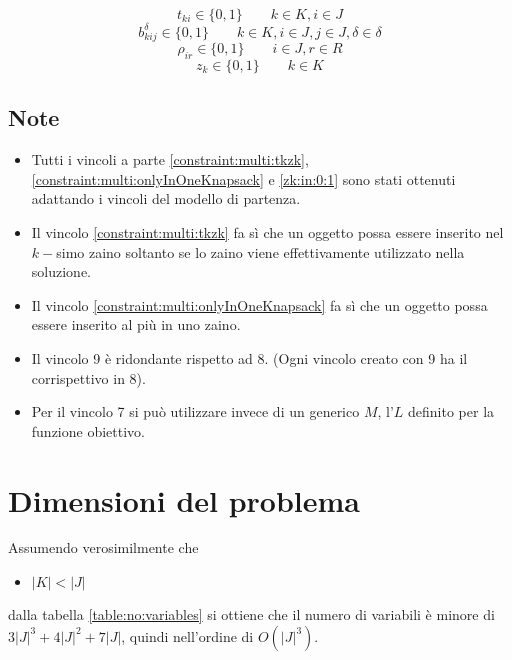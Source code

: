 \documentclass{scrartcl}
\begin{document}
\begin{equation}
t_{ki} \in \{0,1\} \quad \quad k \in K, i \in J
\end{equation}
\begin{equation}
b_{kij}^\delta \in \{0,1\} \quad \quad k \in K, i \in J, j \in J, \delta \in \delta
\end{equation}
\begin{equation}
\rho_{ir} \in \{0,1\} \quad\quad i \in J, r \in R
\end{equation}
\begin{equation}
\label{zk:in:0:1}
z_k \in \{0,1\} \quad \quad k \in K
\end{equation}

\subsection{Note}
\begin{itemize}
\item Tutti i vincoli a parte \ref{constraint:multi:tkzk}, \ref{constraint:multi:onlyInOneKnapsack} e \ref{zk:in:0:1} sono stati ottenuti adattando i vincoli del modello di partenza.
\item Il vincolo \ref{constraint:multi:tkzk} fa sì che un oggetto possa essere inserito nel $k-$simo zaino soltanto se lo zaino viene effettivamente utilizzato nella soluzione.
\item Il vincolo \ref{constraint:multi:onlyInOneKnapsack} fa sì che un oggetto possa essere inserito al più in uno zaino. 
\item Il vincolo 9 è ridondante rispetto ad 8. (Ogni vincolo creato con 9 ha il corrispettivo in 8).
\item Per il vincolo 7 si può utilizzare invece di un generico $M$, l'$L$ definito per la funzione obiettivo.
\end{itemize}

\section{Dimensioni del problema}
Assumendo verosimilmente che 
\begin{itemize}
	\item $|K| < |J|$
\end{itemize}  
dalla tabella \ref{table:no:variables}
si ottiene che il numero di variabili è minore di $3|J|^3 + 4|J|^2 + 7|J|$, quindi
nell'ordine di $O(|J|^3)$.
\end{document}
